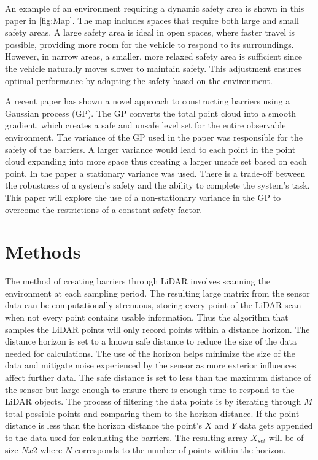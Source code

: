 \documentclass[conference]{IEEEtran}
\begin{document}
An example of an environment requiring a dynamic safety area is shown in this paper in \ref{fig:Map}. The map includes spaces that require both large and small safety areas. A large safety area is ideal in open spaces, where faster travel is possible, providing more room for the vehicle to respond to its surroundings. However, in narrow areas, a smaller, more relaxed safety area is sufficient since the vehicle naturally moves slower to maintain safety. This adjustment ensures optimal performance by adapting the safety based on the environment.
 
 A recent paper \cite{cbfgp} has shown a novel approach to constructing barriers using a Gaussian process (GP). The GP converts the total point cloud into a smooth gradient, which creates a safe and unsafe level set for the entire observable environment. The variance of the GP used in the paper was responsible for the safety of the barriers. A larger variance would lead to each point in the point cloud expanding into more space thus creating a larger unsafe set based on each point. In the paper \cite{cbfgp} a stationary variance was used. There is a trade-off between the robustness of a system's safety and the ability to complete the system's task. This paper will explore the use of a non-stationary variance in the GP to overcome the restrictions of a constant safety factor.  

\section{Methods}
The method of creating barriers through LiDAR involves scanning the environment at each sampling period. The resulting large matrix from the sensor data can be computationally strenuous, storing every point of the LiDAR scan when not every point contains usable information. Thus the algorithm that samples the LiDAR points will only record points within a distance horizon. The distance horizon is set to a known safe distance to reduce the size of the data needed for calculations. The use of the horizon helps minimize the size of the data and mitigate noise experienced by the sensor as more exterior influences affect further data. The safe distance is set to less than the maximum distance of the sensor but large enough to ensure there is enough time to respond to the LiDAR objects. The process of filtering the data points is by iterating through $M$ total possible points and comparing them to the horizon distance. If the point distance is less than the horizon distance the point's $X$ and $Y$ data gets appended to the data used for calculating the barriers. The resulting array $X_{set}$ will be of size $Nx2$ where $N$ corresponds to the number of points within the horizon.
 
\end{document}
